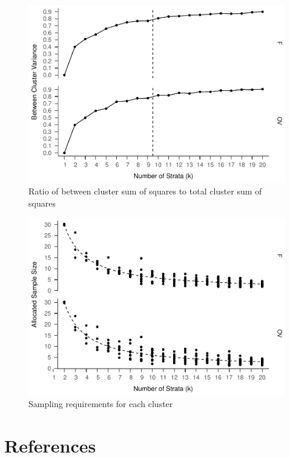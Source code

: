 \documentclass[man]{apa6}
\theoremstyle{definition}
\theoremstyle{definition}
\theoremstyle{definition}
\theoremstyle{remark}
\begin{document}
\begin{figure}
\centering
\includegraphics{Method_files/figure-latex/ratio-full-1.pdf}
\caption{\label{fig:ratio-full}Ratio of between cluster sum of squares to
total cluster sum of squares}
\end{figure}

\begin{figure}
\centering
\includegraphics{Method_files/figure-latex/k-size-full-1.pdf}
\caption{\label{fig:k-size-full}Sampling requirements for each cluster}
\end{figure}

\newpage

\section{References}\label{references}

\begingroup
\setlength{\parindent}{-0.5in} \setlength{\leftskip}{0.5in}

\hypertarget{refs}{}

\endgroup
\end{document}
